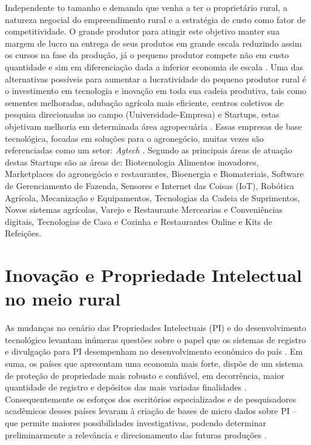 Independente to tamanho e demanda que venha a ter o proprietário rural, a natureza negocial do empreendimento rural e a estratégia de custo como fator de competitividade. O grande produtor para atingir este objetivo manter sua margem de lucro na entrega de seus produtos em grande escala reduzindo assim os cursos na fase da produção, já o pequeno produtor compete não em custo quantidade e sim em diferenciação dada a inferior economia de escala \cite{soares_relacao_2017}. Uma das alternativas possíveis para aumentar a lucratividade do pequeno produtor rural é o investimento em tecnologia e inovação em toda sua cadeia produtiva, tais como sementes melhoradas, adubação agrícola mais eficiente, centros coletivos de pesquisa direcionadas ao campo (Universidade-Empresa) \cite{bochi_dorneles_coletivos_2014, gomes_inovacao_2014} e Startups, estas objetivam melhoria em determinada área agropecuária \cite{junior_agtechs:_2019}. Essas empresas de base tecnológica, focadas em soluções para o agronegócio, muitas vezes são referenciadas como um setor: \textit{Agtech} \cite{blanco_agtechs:_2019}. Segundo  as principais áreas de atuação destas Startups são as áreas de: Biotecnologia Alimentos inovadores, Marketplaces do agronegócio e restaurantes, Bioenergia e Biomateriais, Software de Gerenciamento de Fazenda, Sensores e Internet das Coisas (IoT), Robótica Agrícola, Mecanização e Equipamentos, Tecnologias da Cadeia de Suprimentos, Novos sistemas agrícolas, Varejo e Restaurante Mercearias e Conveniências digitais, Tecnologias de Casa e Cozinha e Restaurantes Online e Kits de Refeições.




\section{Inovação e Propriedade Intelectual no meio rural}

As mudanças no cenário das Propriedades Intelectuais (PI) e do desenvolvimento tecnológico levantam inúmeras questões sobre o papel que os sistemas de registro e divulgação para PI desempenham no desenvolvimento econômico do país \cite{segala_os_2016}. Em suma, os países que apresentam uma economia mais forte, dispõe de um sistema de proteção de propriedade mais robusto e confiável, em decorrência, maior quantidade de registro e depósitos das mais variadas finalidades \cite{mueller_universidades_2014}. Consequentemente os esforços dos escritórios especializados e de pesquisadores acadêmicos desses países levaram à criação de bases de micro dados sobre PI – que permite maiores possibilidades investigativas, podendo determinar preliminarmente a relevância e direcionamento das futuras produções \cite{luna_impacto_2006}. 

\clearpage








